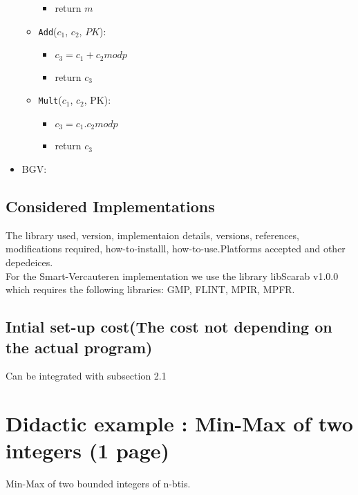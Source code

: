 \documentclass{acm_proc_article-sp}
\begin{document}
\begin{itemize}
\begin{itemize}
\begin{itemize}
\item return $m$
\end{itemize}
\item \texttt{Add}($c_1$, $c_2$, $PK$):
\begin{itemize}
\item $c_3=c_1+c_2 mod p$
\item return $c_3$
\end{itemize}
\item \texttt{Mult}($c_1$, $c_2$, PK):
\begin{itemize}
\item $c_3=c_1.c_2 mod p$
\item return $c_3$
\end{itemize}
\end{itemize}
\item BGV:
\end{itemize}
\subsection{Considered Implementations}

The library used, version, implementaion details, versions, references, modifications required, how-to-installl, how-to-use.Platforms accepted and other depedeices.\\
For the Smart-Vercauteren implementation we use the library libScarab v1.0.0 which requires the following libraries: GMP, FLINT, MPIR, MPFR.
\subsection{Intial set-up cost(The cost not depending on the actual program)}

Can be integrated with subsection 2.1 

\section{ Didactic example :  Min-Max of two integers (1 page)}
Min-Max of two bounded integers of n-btis.
\end{document}

